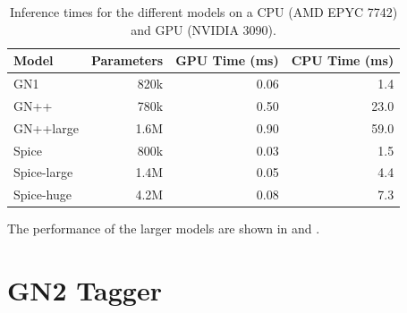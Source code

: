 \begin{table}
    \centering
    \begin{tabular}{lrrr}
        \toprule
        Model & Parameters & GPU Time (ms) & CPU Time (ms) \\
        \midrule
        GN1 & 820k & 0.06 & 1.4 \\
        GN++ & 780k & 0.50 & 23.0 \\
        GN++large & 1.6M & 0.90 & 59.0 \\
        Spice & 800k & 0.03 & 1.5 \\
        Spice-large & 1.4M & 0.05 & 4.4 \\
        Spice-huge & 4.2M & 0.08 & 7.3 \\
        \bottomrule
    \end{tabular}
    \caption{Inference times for the different models on a CPU (AMD EPYC 7742) and GPU (NVIDIA 3090).}
    \label{tab:inference}
\end{table}

The performance of the larger models are shown in  and .


\section{GN2 Tagger}






